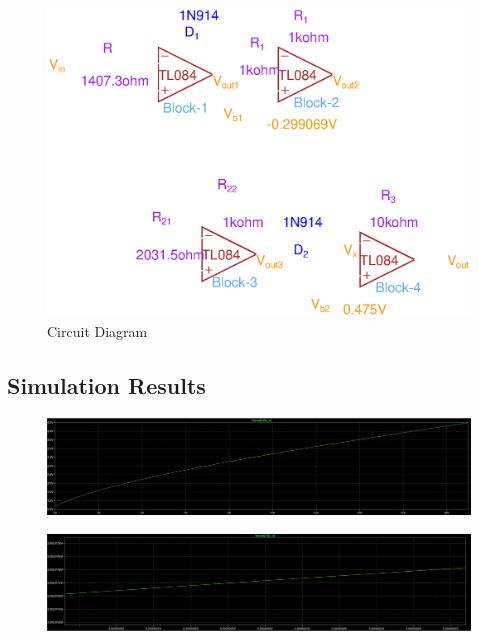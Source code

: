 \documentclass[12pt]{article}
\begin{document}
 \begin{figure}[h!]
\centering
\includegraphics[scale = 0.8]{Modified_Circuit_Design.eps}
\caption{Circuit Diagram}
\end{figure}
\newpage

\begin{landscape}
    \section{Simulation Results}
    
    \begin{figure}[h!]
        \centering
        \includegraphics[scale = 0.45]{Sim_4_1.jpg}
    \end{figure}

    \begin{figure}[h!]
        \centering
        \includegraphics[scale = 0.455]{Sim_4_2.jpg}
    \end{figure}
\end{landscape}
\end{document}
